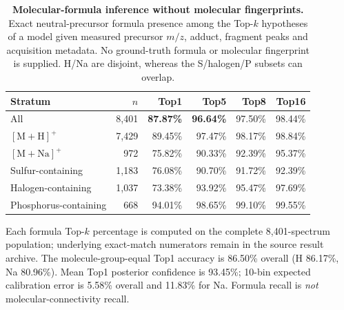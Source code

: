 \begin{table}[!htbp]
\centering
\caption{\textbf{Molecular-formula inference without molecular fingerprints.} Exact neutral-precursor formula presence among the Top-$k$ hypotheses of a model given measured precursor $m/z$, adduct, fragment peaks and acquisition metadata. No ground-truth formula or molecular fingerprint is supplied. H/Na are disjoint, whereas the S/halogen/P subsets can overlap.}
\label{tab:msdev_formula}
\small
\setlength{\tabcolsep}{5pt}
\begin{tabular}{lrrrrr}
\toprule
Stratum & $n$ & Top1 & Top5 & Top8 & Top16 \\
\midrule
All & 8,401 & \textbf{87.87\%} & \textbf{96.64\%} & 97.50\% & 98.44\% \\
$[\mathrm{M+H}]^+$ & 7,429 & 89.45\% & 97.47\% & 98.17\% & 98.84\% \\
$[\mathrm{M+Na}]^+$ & 972 & 75.82\% & 90.33\% & 92.39\% & 95.37\% \\
Sulfur-containing & 1,183 & 76.08\% & 90.70\% & 91.72\% & 92.39\% \\
Halogen-containing & 1,037 & 73.38\% & 93.92\% & 95.47\% & 97.69\% \\
Phosphorus-containing & 668 & 94.01\% & 98.65\% & 99.10\% & 99.55\% \\
\bottomrule
\end{tabular}

\vspace{3pt}
\begin{minipage}{0.97\linewidth}\footnotesize
Each formula Top-$k$ percentage is computed on the complete 8,401-spectrum population; underlying exact-match numerators remain in the source result archive. The molecule-group-equal Top1 accuracy is 86.50\% overall (H 86.17\%, Na 80.96\%). Mean Top1 posterior confidence is 93.45\%; 10-bin expected calibration error is 5.58\% overall and 11.83\% for Na. Formula recall is \emph{not} molecular-connectivity recall.
\end{minipage}
\end{table}

